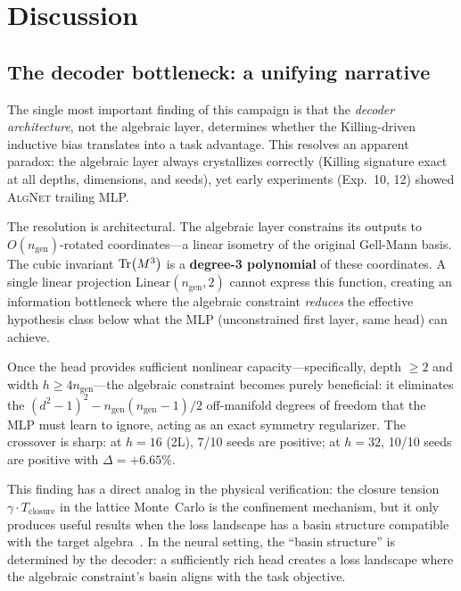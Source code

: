 \documentclass[11pt,a4paper]{article}
\newcommand{\Tclosure}{T_{\mathrm{closure}}}
\newcommand{\ngen}{n_{\mathrm{gen}}}
\newcommand{\AlgNet}{\textsc{AlgNet}}
\theoremstyle{definition}
\begin{document}
\section{Discussion}
\label{sec:discussion}

\subsection{The decoder bottleneck: a unifying narrative}
\label{sec:bottleneck}

The single most important finding of this campaign is that the 
\emph{decoder architecture}, not the algebraic layer, determines whether 
the Killing-driven inductive bias translates into a task advantage. This 
resolves an apparent paradox: the algebraic layer always crystallizes 
correctly (Killing signature exact at all depths, dimensions, and seeds), 
yet early experiments (Exp.~10, 12) showed \AlgNet{} trailing MLP.

The resolution is architectural. The algebraic layer constrains its 
outputs to $O(\ngen)$-rotated coordinates---a linear isometry of the 
original Gell-Mann basis. The cubic invariant $\Tr(M^3)$ is a 
\textbf{degree-3 polynomial} of these coordinates. A single linear 
projection $\text{Linear}(\ngen, 2)$ cannot express this function, 
creating an information bottleneck where the algebraic constraint 
\emph{reduces} the effective hypothesis class below what the MLP 
(unconstrained first layer, same head) can achieve.

Once the head provides sufficient nonlinear capacity---specifically, 
depth $\geq 2$ and width $h \geq 4\ngen$---the algebraic constraint 
becomes purely beneficial: it eliminates the $(d^2-1)^2 - \ngen(\ngen-1)/2$ 
off-manifold degrees of freedom that the MLP must learn to ignore, 
acting as an exact symmetry regularizer. The crossover is sharp: 
at $h = 16$ (2L), 7/10 seeds are positive; at $h = 32$, 10/10 seeds 
are positive with $\Delta = +6.65\%$.

This finding has a direct analog in the physical verification: the 
closure tension $\gamma \cdot \Tclosure$ in the lattice Monte~Carlo is 
the confinement mechanism, but it only produces useful results when the 
loss landscape has a basin structure compatible with the target 
algebra~\cite{moreno2026experimental}. In the neural setting, the 
``basin structure'' is determined by the decoder: a sufficiently rich 
head creates a loss landscape where the algebraic constraint's basin 
aligns with the task objective.
\end{document}
